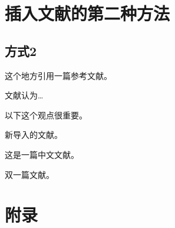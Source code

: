 \documentclass[lang=chs,degree=master,blindreview=true,winfonts=true]{yanputhesis}
\begin{document}
\chapter{插入文献的第二种方法}
\label{sec:org1859e1d}
\section{方式2}
\label{sec:orgc167098}
这个地方引用一篇参考文献\cite{WOS:000448181000017}。

文献\parencite{WOS:000306571800032}认为\ldots{}

以下这个观点很重要。

新导入的文献\cite{Katiyar2021}。

这是一篇中文文献\cite{刘振强2022}。

双一篇文献\cite{Campos2021}。

\printbibliography



\appendix

\chapter{附录}
\label{sec:org8642a47}
\end{document}
